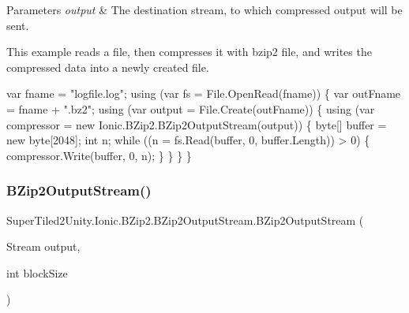 \begin{DoxyParams}{Parameters}
{\em output} & The destination stream, to which compressed output will be sent. \\
\hline
\end{DoxyParams}


This example reads a file, then compresses it with bzip2 file, and writes the compressed data into a newly created file.


\begin{DoxyCode}
var fname = \textcolor{stringliteral}{"logfile.log"};
\textcolor{keyword}{using} (var fs = File.OpenRead(fname))
\{
    var outFname = fname + \textcolor{stringliteral}{".bz2"};
    \textcolor{keyword}{using} (var output = File.Create(outFname))
    \{
        \textcolor{keyword}{using} (var compressor = \textcolor{keyword}{new} Ionic.BZip2.BZip2OutputStream(output))
        \{
            byte[] buffer = \textcolor{keyword}{new} byte[2048];
            \textcolor{keywordtype}{int} n;
            \textcolor{keywordflow}{while} ((n = fs.Read(buffer, 0, buffer.Length)) > 0)
            \{
                compressor.Write(buffer, 0, n);
            \}
        \}
    \}
\}
\end{DoxyCode}
 \mbox{\label{class_super_tiled2_unity_1_1_ionic_1_1_b_zip2_1_1_b_zip2_output_stream_a8ea58c642975a50c8d6ecb65d503f7a6}} 
\subsubsection{\texorpdfstring{B\+Zip2\+Output\+Stream()}{BZip2OutputStream()}\hspace{0.1cm}{\footnotesize\ttfamily [2/4]}}
{\footnotesize\ttfamily Super\+Tiled2\+Unity.\+Ionic.\+B\+Zip2.\+B\+Zip2\+Output\+Stream.\+B\+Zip2\+Output\+Stream (\begin{DoxyParamCaption}\item[{Stream}]{output,  }\item[{int}]{block\+Size }\end{DoxyParamCaption})}



